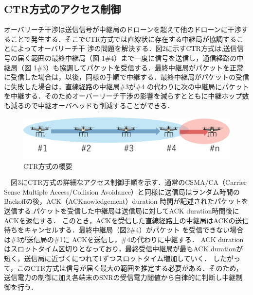 \documentclass[a4paper,10pt]{ltjsarticle}
\begin{document}
\subsection{CTR方式のアクセス制御}
 オーバリーチ干渉は送信信号が中継局のドローンを超えて他のドローンに干渉することで発生する．そこでCTR方式では直線状に存在する中継局が協調することによってオーバリーチ干
渉の問題を解決する．図2に示すCTR方式は,送信信号の届く範囲の最終中継局（図 1\#4）まで一度に信号を送信し，通信経路の中継局（図 1\#3）も協調してパケットを受信する．最終中継局がパケットを正常に受信した場合は，以後，同様の手順で中継する．最終中継局がパケットの受信に失敗した場合は，直線経路の中継局\#3が\#4 の代わりに次の中継局にパケットを中継する．そのためオーバーリーチ干渉の影響を減らすとともに中継ホップ数も減るので中継オーバヘッドも削減することができる．
\begin{figure}[H]
  \centering
  \includegraphics[width=\linewidth]{ctr_topology.png} %
  \caption{CTR方式の概要}
  \label{fig:CTR方式のトポロジー} %
\end{figure}
　図3にCTR方式の詳細なアクセス制御手順を示す．通常のCSMA/CA（Carrier Sense Multiple Access/Collision Avoidance）と同様に送信局はランダム時間のBackoffの後，ACK（ACKnowledgement）duration
時間が記述されたパケットを送信する.パケットを受信した中継局は送信局に対してACK duration時間後にACKを返信する．
このとき，ACKを受信した直線経路上の中継局はACKの送信待ちをキャンセルする．最終中継局（図2\#4）がパケット を受信できない場合は\#3が送信局の\#1に ACKを送信し，\#4の代わりに中継する．
ACK duration はスロットタイム区切りとなっており，最終受信中継局が最もACK durationが短く，送信局に近づくにつれて1ずつスロットタイム増加していく．
したがって，このCTR方式は信号が届く最大の範囲を推定する必要がある．そのため，送信電力の制御に加え各端末のSNRの受信電力閾値から自律的に判断し中継制御を行う．
\end{document}
